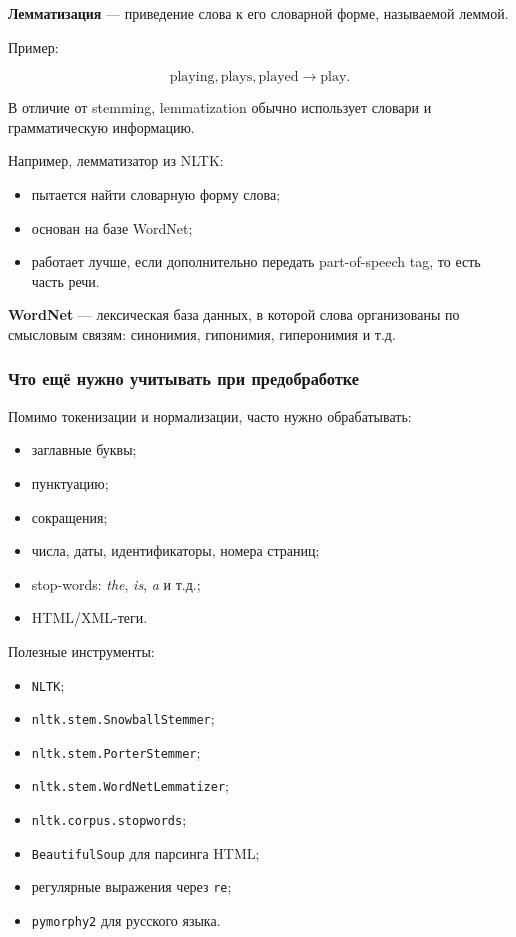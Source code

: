 \documentclass[a4paper,12pt]{article}
\begin{document}
\textbf{Лемматизация} --- приведение слова к его словарной форме, называемой леммой.

Пример:

\[
\text{playing}, \text{plays}, \text{played}
\longrightarrow
\text{play}.
\]

В отличие от stemming, lemmatization обычно использует словари и грамматическую информацию.

Например, лемматизатор из NLTK:

\begin{itemize}
    \item пытается найти словарную форму слова;
    \item основан на базе WordNet;
    \item работает лучше, если дополнительно передать part-of-speech tag, то есть часть речи.
\end{itemize}

\textbf{WordNet} --- лексическая база данных, в которой слова организованы по смысловым связям: синонимия, гипонимия, гиперонимия и т.д.

\subsubsection{Что ещё нужно учитывать при предобработке}

Помимо токенизации и нормализации, часто нужно обрабатывать:

\begin{itemize}
    \item заглавные буквы;
    \item пунктуацию;
    \item сокращения;
    \item числа, даты, идентификаторы, номера страниц;
    \item stop-words: \textit{the}, \textit{is}, \textit{a} и т.д.;
    \item HTML/XML-теги.
\end{itemize}

Полезные инструменты:

\begin{itemize}
    \item \texttt{NLTK};
    \item \texttt{nltk.stem.SnowballStemmer};
    \item \texttt{nltk.stem.PorterStemmer};
    \item \texttt{nltk.stem.WordNetLemmatizer};
    \item \texttt{nltk.corpus.stopwords};
    \item \texttt{BeautifulSoup} для парсинга HTML;
    \item регулярные выражения через \texttt{re};
    \item \texttt{pymorphy2} для русского языка.
\end{itemize}
\end{document}
